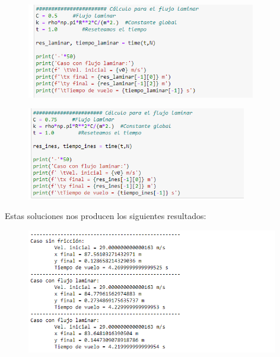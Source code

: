 \documentclass[11pt]{article}
\begin{document}
\newpage
	\begin{figure}[h!]
		\centering
		\includegraphics[width=10cm]{Img/9.2.PNG}
	\end{figure}
	\begin{figure}[h!]
		\centering
		\includegraphics[width=9.6cm]{Img/9.3.PNG}
	\end{figure}
	
	Estas soluciones nos producen los siguientes resultados:
	\begin{figure}[h!]
		\centering
		\includegraphics[width=11cm]{Img/10.PNG}
	\end{figure}
	
\end{document}
